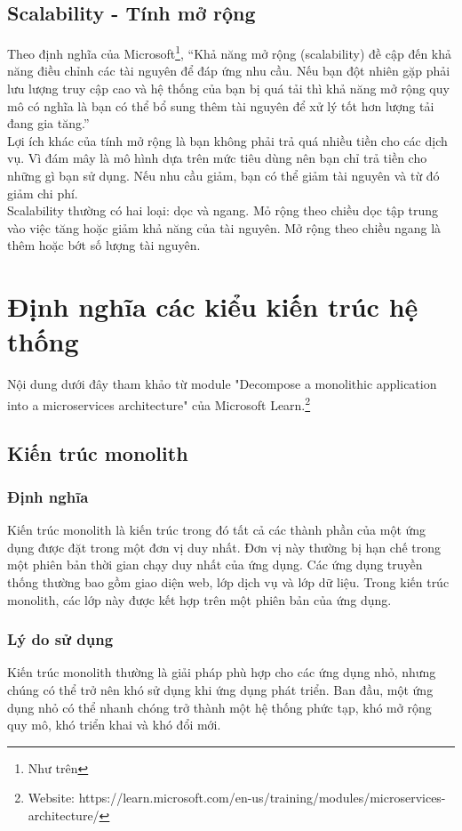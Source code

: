 \subsection{Scalability - Tính mở rộng}
\noindent Theo định nghĩa của Microsoft\footnote{Như trên}, “Khả năng mở rộng (scalability) đề cập đến khả năng điều chỉnh các tài nguyên để đáp ứng nhu cầu. Nếu bạn đột nhiên gặp phải lưu lượng truy cập cao và hệ thống của bạn bị quá tải thì khả năng mở rộng quy mô có nghĩa là bạn có thể bổ sung thêm tài nguyên để xử lý tốt hơn lượng tải đang gia tăng.” \\[0.5cm]
\noindent Lợi ích khác của tính mở rộng là bạn không phải trả quá nhiều tiền cho các dịch vụ. Vì đám mây là mô hình dựa trên mức tiêu dùng nên bạn chỉ trả tiền cho những gì bạn sử dụng. Nếu nhu cầu giảm, bạn có thể giảm tài nguyên và từ đó giảm chi phí. \\[0.5cm]
\noindent Scalability thường có hai loại: dọc và ngang. Mỏ rộng theo chiều dọc tập trung vào việc tăng hoặc giảm khả năng của tài nguyên. Mở rộng theo chiều ngang là thêm hoặc bớt số lượng tài nguyên.

\section{Định nghĩa các kiểu kiến trúc hệ thống}
\noindent Nội dung dưới đây tham khảo từ module "Decompose a monolithic application into a microservices architecture" của Microsoft Learn.\footnote{Website: https://learn.microsoft.com/en-us/training/modules/microservices-architecture/}
\subsection{Kiến trúc monolith}
\subsubsection{Định nghĩa}
\noindent Kiến trúc monolith là kiến trúc trong đó tất cả các thành phần của một ứng dụng được đặt trong một đơn vị duy nhất. Đơn vị này thường bị hạn chế trong một phiên bản thời gian chạy duy nhất của ứng dụng. Các ứng dụng truyền thống thường bao gồm giao diện web, lớp dịch vụ và lớp dữ liệu. Trong kiến trúc monolith, các lớp này được kết hợp trên một phiên bản của ứng dụng.
\subsubsection{Lý do sử dụng}
\noindent Kiến trúc monolith thường là giải pháp phù hợp cho các ứng dụng nhỏ, nhưng chúng có thể trở nên khó sử dụng khi ứng dụng phát triển. Ban đầu, một ứng dụng nhỏ có thể nhanh chóng trở thành một hệ thống phức tạp, khó mở rộng quy mô, khó triển khai và khó đổi mới.
